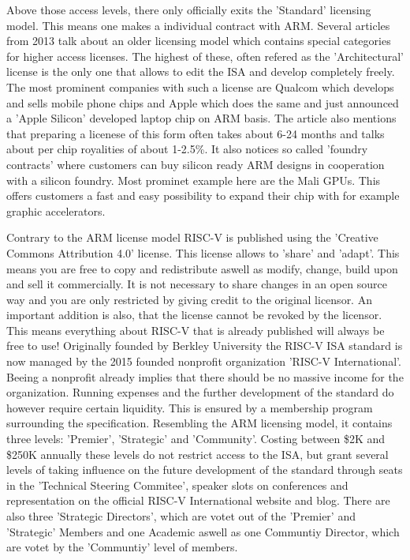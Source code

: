 \documentclass[conference]{IEEEtran}
\begin{document}
	Above those access levels, there only officially exits the 'Standard' licensing model. This means one makes a individual contract with ARM.
	Several articles from 2013 \cite{Demerjian2013}\cite{Demerjian2013a} talk about an older licensing model which contains special categories for higher access licenses. The highest of these, often refered as the 'Architectural' license is the only one that allows to edit the \gls{ISA} and develop completely freely. The most prominent companies with such a license are Qualcom which develops and sells mobile phone chips and Apple which does the same and just announced a 'Apple Silicon' developed laptop chip on ARM basis. \cite{Apple2020} The article also mentions that preparing a licenese of this form often takes about 6-24 months and talks about per chip royalities of about 1-2.5\%. It also notices so called 'foundry contracts' where customers can buy silicon ready ARM designs in cooperation with a silicon foundry. Most prominet example here are the Mali GPUs. This offers customers a fast and easy possibility to expand their chip with for example graphic accelerators.

	Contrary to the ARM license model RISC-V is published using the 'Creative Commons Attribution 4.0' license. \cite{Waterman2017}\cite{Waterman2017a} This license allows to 'share' and 'adapt'. This means you are free to copy and redistribute aswell as modify, change, build upon and sell it commercially. It is not necessary to share changes in an open source way and you are only restricted by giving credit to the original licensor. \cite{CC} An important addition is also, that the license cannot be revoked by the licensor. This means everything about RISC-V that is already published will always be free to use!
	Originally founded by Berkley University the RISC-V \gls{ISA} standard is now managed by the 2015 founded nonprofit organization 'RISC-V International'. \cite{RVIAbout} Beeing a nonprofit already implies that there should be no massive income for the organization. Running expenses and the further development of the standard do however require certain liquidity. This is ensured by a membership program surrounding the specification. \cite{RVIMem} Resembling the ARM licensing model, it contains three levels: 'Premier', 'Strategic' and 'Community'. Costing between \$2K and \$250K annually these levels do not restrict access to the \gls{ISA}, but grant several levels of taking influence on the future development of the standard through seats in the 'Technical Steering Commitee', speaker slots on conferences and representation on the official RISC-V International website and blog. There are also three 'Strategic Directors', which are votet out of the 'Premier' and 'Strategic' Members and one Academic aswell as one Communtiy Director, which are votet by the 'Communtiy' level of members. \cite{RVIAss}
\end{document}
